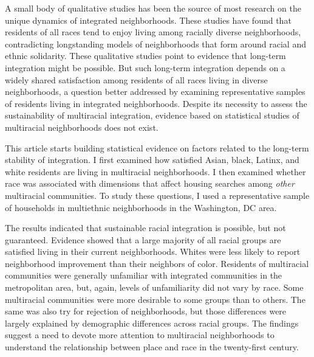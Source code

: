\documentclass{baderart}
\begin{document}
A small body of qualitative studies has been the source of most research on the unique dynamics of integrated neighborhoods. These studies have found that residents of all races tend to enjoy living among racially diverse neighborhoods, contradicting longstanding models of neighborhoods that form around racial and ethnic solidarity. These qualitative studies point to evidence that long-term integration might be possible. But such long-term integration depends on a widely shared satisfaction among residents of all races living in diverse neighborhoods, a question better addressed by examining representative samples of residents living in integrated neighborhoods. Despite its necessity to assess the sustainability of multiracial integration, evidence based on statistical studies of multiracial neighborhoods does not exist. 

This article starts building statistical evidence on factors related to the long-term stability of integration. I first examined how satisfied Asian, black, Latinx, and white residents are living in multiracial neighborhoods. I then examined whether race was associated with dimensions that affect housing searches among \emph{other} multiracial communities. To study these questions, I used a representative sample of households in multiethnic neighborhoods in the Washington, DC area. 

The results indicated that sustainable racial integration is possible, but not guaranteed. Evidence showed that a large majority of all racial groups are satisfied living in their current neighborhoods. Whites were less likely to report neighborhood improvement than their neighbors of color. Residents of multiracial communities were generally unfamiliar with integrated communities in the metropolitan area, but, again, levels of unfamiliarity did not vary by race. Some multiracial communities were more desirable to some groups than to others. The same was also try for rejection of neighborhoods, but those differences were largely explained by demographic differences across racial groups. The findings suggest a need to devote more attention to multiracial neighborhoods to understand the relationship between place and race in the twenty-first century. 
\end{document}
